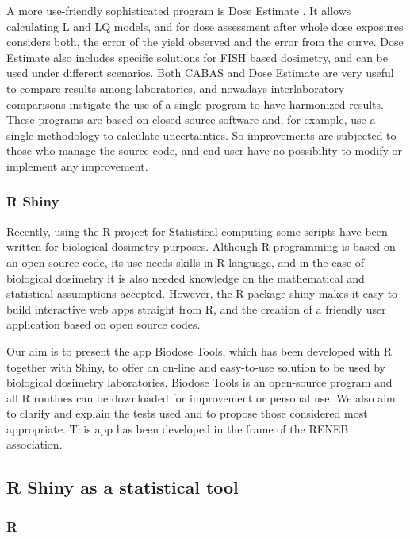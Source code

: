 \documentclass[]{scrartcl}
\begin{document}
A more use-friendly sophisticated program is Dose Estimate \citep{Ainsbury2010}. It allows calculating L and LQ models, and for dose assessment after whole dose exposures considers both, the error of the yield observed and the error from the curve. Dose Estimate also includes specific solutions for FISH based dosimetry, and can be used under different scenarios. Both CABAS and Dose Estimate are very useful to compare results among laboratories, and nowadays-interlaboratory comparisons instigate the use of a single program to have harmonized results. These programs are based on closed source software and, for example, use a single methodology to calculate uncertainties. So improvements are subjected to those who manage the source code, and end user have no possibility to modify or implement any improvement.

\hypertarget{r-shiny}{%
\subsubsection{R Shiny}\label{r-shiny}}

Recently, using the R project for Statistical computing \citep{R-base} some scripts have been written for biological dosimetry purposes. Although R programming is based on an open source code, its use needs skills in R language, and in the case of biological dosimetry it is also needed knowledge on the mathematical and statistical assumptions accepted. However, the R package shiny makes it easy to build interactive web apps straight from R, and the creation of a friendly user application based on open source codes.

Our aim is to present the app Biodose Tools, which has been developed with R together with Shiny, to offer an on-line and easy-to-use solution to be used by biological dosimetry laboratories. Biodose Tools is an open-source program and all R routines can be downloaded for improvement or personal use. We also aim to clarify and explain the tests used and to propose those considered most appropriate. This app has been developed in the frame of the RENEB association.

\hypertarget{intro-rlang}{%
\subsection{R Shiny as a statistical tool}\label{intro-rlang}}

\hypertarget{r}{%
\subsubsection{R}\label{r}}
\end{document}
